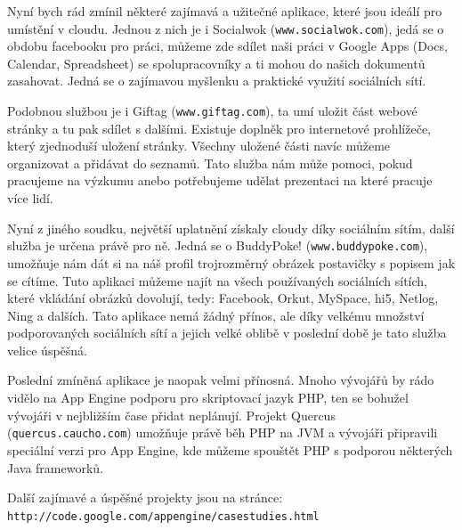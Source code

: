 Nyní bych rád zmínil některé zajímavá a užitečné aplikace, které jsou ideálí pro umístění v cloudu. Jednou z nich je i Socialwok (\verb|www.socialwok.com|), jedá se o obdobu facebooku pro práci, můžeme zde sdílet naši práci v Google Apps (Docs, Calendar, Spreadsheet) se spolupracovníky a ti mohou do našich dokumentů zasahovat. Jedná se o zajímavou myšlenku a praktické využití sociálních sítí.

Podobnou službou je i Giftag (\verb|www.giftag.com|), ta umí uložit část webové stránky a tu pak sdílet s dalšími. Existuje doplněk pro internetové prohlížeče, který zjednoduší uložení stránky. Všechny uložené části navíc můžeme organizovat a přidávat do seznamů. Tato služba nám může pomoci, pokud pracujeme na výzkumu anebo potřebujeme udělat prezentaci na které pracuje více lidí.
 
Nyní z jiného soudku, největší uplatnění získaly cloudy díky sociálním sítím, další služba je určena právě pro ně. Jedná se o BuddyPoke! (\verb|www.buddypoke.com|), umožňuje nám dát si na náš profil trojrozměrný obrázek postavičky s popisem jak se cítíme. Tuto aplikaci můžeme najít na všech používaných sociálních sítích, které vkládání obrázků dovolují, tedy: Facebook, Orkut, MySpace, hi5, Netlog, Ning a dalších. Tato aplikace nemá žádný přínos, ale díky velkému množství podporovaných sociálních sítí a jejich velké oblibě v poslední době je tato služba velice úspěšná.

Poslední zmíněná aplikace je naopak velmi přínosná. Mnoho vývojářů by rádo vidělo na App Engine podporu pro skriptovací jazyk PHP, ten se bohužel vývojáři v nejbližším čase přidat neplánují. Projekt Quercus (\verb|quercus.caucho.com|) umožňuje právě běh PHP na JVM a vývojáři připravili speciální verzi pro App Engine, kde můžeme spouštět PHP s podporou některých Java frameworků.

Další zajímavé a úspěšné projekty jsou na stránce: \verb|http://code.google.com/appengine/casestudies.html|